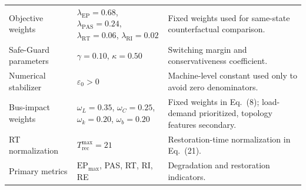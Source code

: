 \documentclass[10pt]{article}
\makeatletter
\newenvironment{exporttable}{\par\noindent\begin{minipage}{\linewidth}\def\@captype{table}}{\end{minipage}\par}
\makeatother
\begin{document}
\begin{exporttable}
\begin{tabular}{p{} p{} p{}}
\rowcolor{RowPhysical}
Objective weights & $\lambda_{\mathrm{EP}}=0.68$, $\lambda_{\mathrm{PAS}}=0.24$, $\lambda_{\mathrm{RT}}=0.06$, $\lambda_{\mathrm{RI}}=0.02$ & Fixed weights used for same-state counterfactual comparison. \\
\rowcolor{RowRisk}
Safe-Guard parameters & $\gamma=0.10$, $\kappa=0.50$ & Switching margin and conservativeness coefficient. \\
\rowcolor{RowNeutral}
Numerical stabilizer & $\varepsilon_0>0$ & Machine-level constant used only to avoid zero denominators. \\
\rowcolor{RowScenario}
Bus-impact weights & $\omega_L=0.35$, $\omega_C=0.25$, $\omega_k=0.20$, $\omega_b=0.20$ & Fixed weights in Eq.~(8); load-demand prioritized, topology features secondary. \\
\rowcolor{RowPhysical}
RT normalization & $T_{\mathrm{rec}}^{\max}=21$ & Restoration-time normalization in Eq.~(21). \\
\rowcolor{RowNeutral}
Primary metrics & $\mathrm{EP}_{\max}$, PAS, RT, RI, RE & Degradation and restoration indicators. \\
\bottomrule
\end{tabular}
\end{exporttable}
\clearpage
\setcounter{table}{3}
\end{document}

